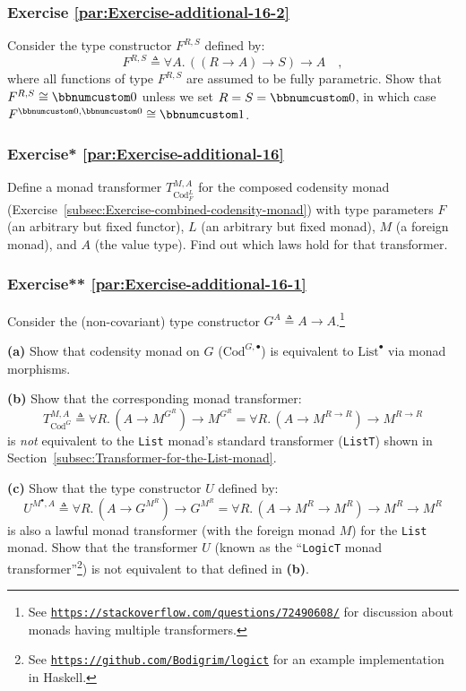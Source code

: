 \subsubsection{Exercise \label{par:Exercise-additional-16-2}\ref{par:Exercise-additional-16-2}}

Consider the type constructor $F^{R,S}$ defined by:
\[
F^{R,S}\triangleq\forall A.\,((R\rightarrow A)\rightarrow S)\rightarrow A\quad,
\]
where all functions of type $F^{R,S}$ are assumed to be fully parametric.
Show that $F^{R,S}\cong\bbnum 0$ unless we set $R=S=\bbnum 0$, in
which case $F^{\bbnum 0,\bbnum 0}\cong\bbnum 1$. 

\subsubsection{Exercise{*} \label{par:Exercise-additional-16}\ref{par:Exercise-additional-16}}

Define a monad transformer $T_{\text{Cod}_{F}^{L}}^{M,A}$ for the
composed codensity monad (Exercise~\ref{subsec:Exercise-combined-codensity-monad})
with type parameters $F$ (an arbitrary but fixed functor), $L$ (an
arbitrary but fixed monad), $M$ (a foreign monad), and $A$ (the
value type). Find out which laws hold for that transformer.

\subsubsection{Exercise{*}{*} \label{par:Exercise-additional-16-1}\ref{par:Exercise-additional-16-1}}

Consider the (non-covariant) type constructor $G^{A}\triangleq A\rightarrow A$.\footnote{See \texttt{\href{https://stackoverflow.com/questions/72490608/}{https://stackoverflow.com/questions/72490608/}}
for discussion about monads having multiple transformers.}

\textbf{(a)} Show that codensity monad on $G$ ($\text{Cod}^{G,\bullet}$)
is equivalent to $\text{List}^{\bullet}$ via monad morphisms.

\textbf{(b)} Show that the corresponding monad transformer: 
\[
T_{\text{Cod}^{G}}^{M,A}\triangleq\forall R.\,(A\rightarrow M^{G^{R}})\rightarrow M^{G^{R}}=\forall R.\,(A\rightarrow M^{R\rightarrow R})\rightarrow M^{R\rightarrow R}
\]
is \emph{not} equivalent to the \lstinline!List! monad\textsf{'}s standard
transformer (\lstinline!ListT!) shown in Section~\ref{subsec:Transformer-for-the-List-monad}.

\textbf{(c)} Show that the type constructor $U$ defined by:
\[
U^{M^{\bullet},A}\triangleq\forall R.\,(A\rightarrow G^{M^{R}})\rightarrow G^{M^{R}}=\forall R.\,(A\rightarrow M^{R}\rightarrow M^{R})\rightarrow M^{R}\rightarrow M^{R}
\]
is also a lawful monad transformer (with the foreign monad $M$) for
the \lstinline!List! monad. Show that the transformer $U$ (known
as the \textsf{``}\lstinline!LogicT! monad transformer\textsf{''}\footnote{See \texttt{\href{https://github.com/Bodigrim/logict}{https://github.com/Bodigrim/logict}}
for an example implementation in Haskell.}) is not equivalent to that defined in \textbf{(b)}. 

